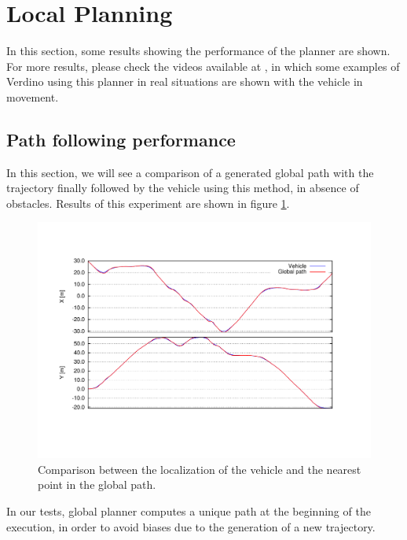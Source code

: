 \graphicspath{{./images/chapter07/bmps/}{./images/chapter07/vects/}{./images/chapter07/}}

\section{Local Planning}\label{ch:chapter07_02}

In this section, some results showing the performance of the planner are shown. For more results, please check the videos available at , in which some examples of Verdino using this planner in real situations are shown with the vehicle in movement.

\subsection{Path following performance}\label{ch:chapter07_02_01}

In this section, we will see a comparison of a generated global path with the trajectory finally followed by the vehicle using this method, in absence of obstacles. Results of this experiment are shown in figure \ref{fig:cp07_localization_diff}.

\begin{figure}[h!]
  \centering
  \includegraphics[trim=50 50 90 60, clip]{differences}
  \caption{Comparison between the localization of the vehicle and the nearest point in the global path.}\label{fig:cp07_localization_diff}
\end{figure}

In our tests, global planner computes a unique path at the beginning of the execution, in order to avoid biases due to the generation of a new trajectory.


